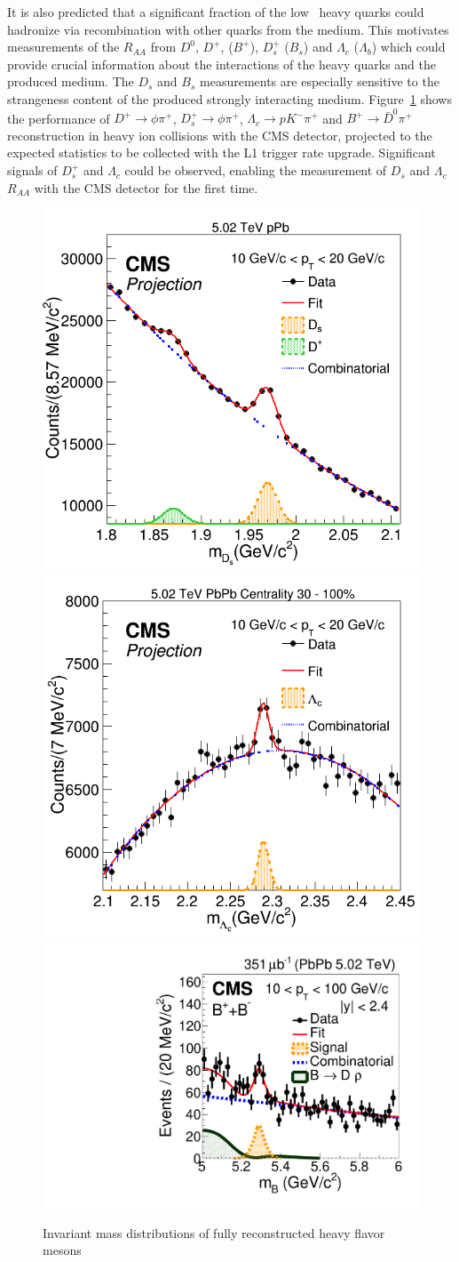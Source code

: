 It is also predicted that a significant fraction of the low \pt\ heavy quarks could hadronize via recombination with other quarks from the medium. This motivates measurements of the $R_{AA}$ from $D^0$, $D^+$, ($B^+$), $D_s^+$ ($B_s$) and $\Lambda_c$ ($\Lambda_b$) which could provide crucial information about the interactions of the heavy quarks and the produced medium. The $D_s$ and $B_s$ measurements are especially sensitive to the strangeness content of the produced strongly interacting medium. Figure~\ref{fig:HFMesonMass} shows the performance of $D^+\rightarrow \phi\pi^+$, $D_s^+\rightarrow \phi \pi^+$, $\Lambda_c\rightarrow p K^-\pi^+$ and $B^+\rightarrow \bar{D}^0 \pi^+$ reconstruction in heavy ion collisions with the CMS detector, projected to the expected statistics to be collected with the L1 trigger rate upgrade. Significant signals of $D_s^+$ and $\Lambda_c$ could be observed, enabling the measurement of $D_s$ and $\Lambda_c$ $R_{AA}$ with the CMS detector for the first time. 


\begin{figure}[!ht]
\begin{center}
\includegraphics[width=.32\textwidth]{InvMassFigures/Ds.png}
\includegraphics[width=.32\textwidth]{InvMassFigures/LambdaC.png}
\includegraphics[width=.335\textwidth]{InvMassFigures/BtoDpi_data_PbPb_10_100.pdf}
\caption{Invariant mass distributions of fully reconstructed heavy flavor mesons}
\label{fig:HFMesonMass}
\end{center}
\end{figure}

